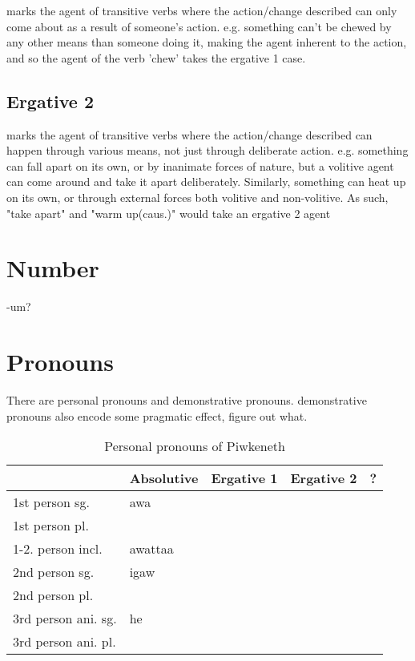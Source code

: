 \documentclass[executivepaper,10pt,twoside,openany,draft]{memoir}
\newcommand{\lang}{Piwkeneth}
\begin{document}
marks the agent of transitive verbs where the action/change described can only come about as a result of someone's action. e.g. something can't be chewed by any other means than someone doing it, making the agent inherent to the action, and so the agent of the verb 'chew' takes the ergative 1 case. 

\subsection{Ergative 2}

marks the agent of transitive verbs where the action/change described can happen through various means, not just through deliberate action. e.g. something can fall apart on its own, or by inanimate forces of nature, but a volitive agent can come around and take it apart deliberately. Similarly, something can heat up on its own, or through external forces both volitive and non-volitive. As such, "take apart" and "warm up(caus.)" would take an ergative 2 agent

\section{Number}

-um?

\section{Pronouns}

There are personal pronouns and demonstrative pronouns. demonstrative pronouns also encode some pragmatic effect, figure out what.

\begin{table}[ht]
    \centering
    \begin{tabular}{lllll}
        \toprule
                             & Absolutive   & Ergative 1 & Ergative 2 & ? \\
        \midrule
        1st person sg.       & awa          &       &   & \\
        1st person pl.       &          &     &   & \\
        1-2. person incl.    & awattaa    &  &   & \\
        2nd person sg.       & igaw         &     &   & \\
        2nd person pl.       &        &   &   & \\
        3rd person ani. sg.  & he           &        &   & \\
        3rd person ani. pl.  &           &     &   & \\
        \bottomrule
    \end{tabular}
    \caption{Personal pronouns of \lang}
\end{table}
\end{document}
